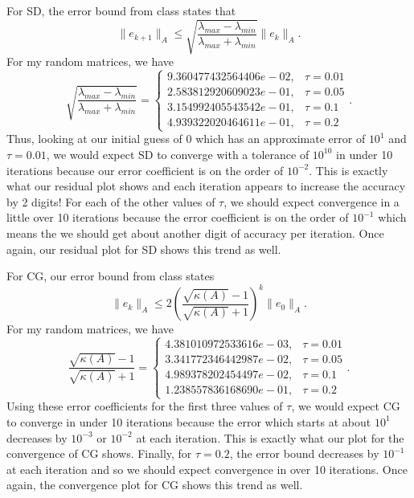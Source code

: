 \documentclass[a4paper,12pt]{article}
\newcommand{\norm}[1]{\lVert #1 \rVert}
\begin{document}
\begin{enumerate}[label = \arabic*)]
\begin{enumerate}[label = (\alph*)]
		For SD, the error bound from class states that
		\[
			\norm{e_{k+1}}_A \leq \sqrt{\frac{\lambda_{max} - \lambda_{min}}{\lambda_{max} + \lambda_{min}}} \norm{e_k}_A.
		\]
		For my random matrices, we have
		\[
			\sqrt{\frac{\lambda_{max} - \lambda_{min}}{\lambda_{max} + \lambda_{min}}} = \begin{cases}
				9.360477432564406e-02, & \tau = 0.01 \\
				2.583812920609023e-01, & \tau = 0.05 \\
				3.154992405543542e-01, & \tau = 0.1   \\
				4.939322020464611e-01, & \tau = 0.2
			\end{cases}.
		\]
		Thus, looking at our initial guess of $ 0 $ which has an approximate error of $ 10^1 $ and $ \tau = 0.01 $, we would expect SD to converge with a tolerance of $ 10^{10} $ in under 10 iterations because our error coefficient is on the order of $ 10^{-2} $. This is exactly what our residual plot shows and each iteration appears to increase the accuracy by 2 digits! For each of the other values of $ \tau $, we should expect convergence in a little over 10 iterations because the error coefficient is on the order of $ 10^{-1} $ which means the we should get about another digit of accuracy per iteration. Once again, our residual plot for SD shows this trend as well.
		
		For CG, our error bound from class states
		\[
			\norm{e_{k}}_A \leq 2 \left(\frac{\sqrt{\kappa(A)} - 1}{\sqrt{\kappa(A)} + 1}\right)^k \norm{e_0}_A.
		\]
		For my random matrices, we have
		\[
			\frac{\sqrt{\kappa(A)} - 1}{\sqrt{\kappa(A)} + 1} = \begin{cases}
				4.381010972533616e-03, & \tau = 0.01 \\
				3.341772346442987e-02, & \tau = 0.05 \\
				4.989378202454497e-02, & \tau = 0.1 \\
				1.238557836168690e-01, & \tau = 0.2
			\end{cases}.
		\]
		Using these error coefficients for the first three values of $ \tau $, we would expect CG to converge in under 10 iterations because the error which starts at about $ 10^1 $ decreases by $ 10^{-3} $ or $ 10^{-2} $ at each iteration. This is exactly what our plot for the convergence of CG shows. Finally, for $ \tau = 0.2 $, the error bound decreases by $ 10^{-1} $ at each iteration and so we should expect convergence in over 10 iterations. Once again, the convergence plot for CG shows this trend as well. 
		

\end{enumerate}
\end{enumerate}
\end{document}
